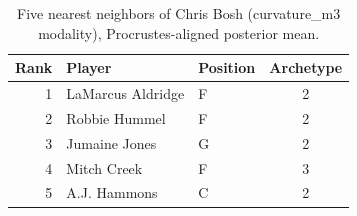 \begin{table}[htbp]
  \centering\small
  \begin{tabular}{rllc}
    \toprule
    Rank & Player & Position & Archetype \\
    \midrule
    1 & LaMarcus Aldridge & F & 2 \\
    2 & Robbie Hummel & F & 2 \\
    3 & Jumaine Jones & G & 2 \\
    4 & Mitch Creek & F & 3 \\
    5 & A.J. Hammons & C & 2 \\
    \bottomrule
  \end{tabular}
  \caption{Five nearest neighbors of Chris Bosh (curvature_m3 modality), Procrustes-aligned posterior mean.}
  \label{tab:Chris_Bosh_neighbors_curvature_m3}
\end{table}

